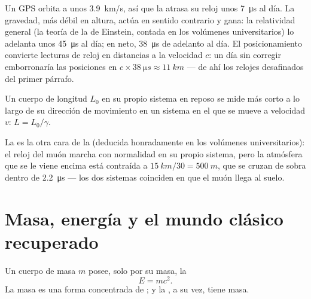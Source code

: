 \begin{remark}\label{rem:g12:special-relativity:gps}
Un  GPS orbita a unos \qty{3.9}{km/s}, así que la  atrasa
su reloj unos \qty{7}{\micro s} al día. La gravedad, más débil en altura, actúa en
sentido contrario y gana: la relatividad general (la teoría de la  de
Einstein, contada en los volúmenes universitarios) lo adelanta unos
\qty{45}{\micro s} al día; en neto, \qty{38}{\micro s} de adelanto al día. El
posicionamiento convierte lecturas de reloj en distancias a la velocidad $c$: un día
sin corregir emborronaría las posiciones en
$c \times \qty{38}{\micro s} \approx \qty{11}{km}$ --- de ahí los relojes desafinados
del primer párrafo.
\end{remark}

\begin{proposition}\label{prop:g12:special-relativity:contraction}
Un cuerpo de longitud $L_0$ en su propio sistema en reposo se mide más corto a lo
largo de su dirección de movimiento en un sistema en el que se mueve a velocidad $v$:
$L = L_0/\gamma$.
\end{proposition}
\admitted

\begin{remark}\label{rem:g12:special-relativity:muonframe}
La  es la otra cara de la  (deducida
honradamente en los volúmenes universitarios): el reloj del muón marcha con normalidad
en su propio sistema, pero la atmósfera que se le viene encima está contraída a
$\qty{15}{km}/30 = \qty{500}{m}$, que se cruzan de sobra dentro de
\qty{2.2}{\micro s} --- los dos sistemas coinciden en que el muón llega al suelo.
\end{remark}

\section{Masa, energía y el mundo clásico recuperado}

\begin{theorem}\label{thm:g12:special-relativity:emc2}
Un cuerpo de masa $m$ posee, solo por su masa, la 
\[ E = m c^2 . \]
La masa es una forma concentrada de ; y la , a su vez, tiene masa.
\end{theorem}
\admitted

